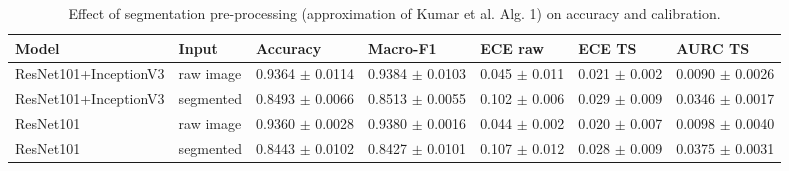 \begin{table}[ht]
\centering
\small
\caption{Effect of segmentation pre-processing (approximation of Kumar et al. Alg. 1) on accuracy and calibration.}
\label{tab:tab9_segmentation_ablation}
\begin{tabular}{lllllll}
\hline
Model & Input & Accuracy & Macro-F1 & ECE raw & ECE TS & AURC TS \\
\hline
ResNet101+InceptionV3 & raw image & 0.9364 $\pm$ 0.0114 & 0.9384 $\pm$ 0.0103 & 0.045 $\pm$ 0.011 & 0.021 $\pm$ 0.002 & 0.0090 $\pm$ 0.0026 \\
ResNet101+InceptionV3 & segmented & 0.8493 $\pm$ 0.0066 & 0.8513 $\pm$ 0.0055 & 0.102 $\pm$ 0.006 & 0.029 $\pm$ 0.009 & 0.0346 $\pm$ 0.0017 \\
ResNet101 & raw image & 0.9360 $\pm$ 0.0028 & 0.9380 $\pm$ 0.0016 & 0.044 $\pm$ 0.002 & 0.020 $\pm$ 0.007 & 0.0098 $\pm$ 0.0040 \\
ResNet101 & segmented & 0.8443 $\pm$ 0.0102 & 0.8427 $\pm$ 0.0101 & 0.107 $\pm$ 0.012 & 0.028 $\pm$ 0.009 & 0.0375 $\pm$ 0.0031 \\
\hline
\end{tabular}
\end{table}